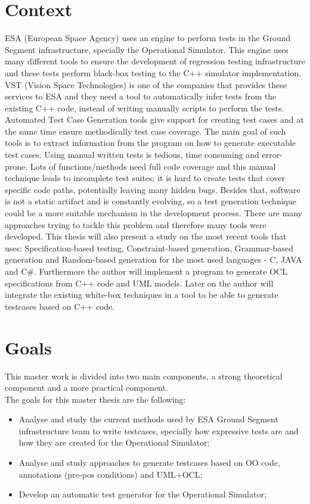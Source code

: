 \documentclass[a4paper,12pt]{article}
\begin{document}
\section{\Large Context}
ESA (European Space Agency) uses an engine to perform tests in the Ground Segment infrastructure, specially the Operational Simulator.
This engine uses many different tools to ensure the development of regression testing infrastructure and these tests perform black-box
testing to the C++ simulator implementation.
VST (Vision Space Technologies) is one of the companies that provides
these services to ESA and they need a tool to  automatically infer tests from the existing C++ code, instead of writing manually scripts to perform the tests.
Automated Test Case Generation tools give support for creating test cases and at the same time ensure methodically test case coverage.
The main goal of such tools is to extract information from the program on how to generate executable test cases.
Using manual written tests is tedious, time consuming and error-prone.
Lots of functions/methods need full code coverage and this manual technique leads to incomplete test suites;
it is hard to create tests that cover specific code paths, potentially leaving many hidden bugs.
Besides that, software is not a static artifact and is constantly evolving, so a test generation technique could be a more suitable mechanism in the development process.
There are many approaches trying to tackle this problem and therefore many tools were developed. This thesis will also present a study on the most
recent tools that uses: Specification-based testing, Constraint-based generation, Grammar-based generation and Random-based generation
for the most used languages - C, JAVA and C\#.
Furthermore the author will implement a program to generate OCL specifications from C++ code and UML models. Later on the author will integrate the
existing white-box techniques in a tool to be able to generate testcases based on C++ code.

\section{\Large Goals}
This master work is divided into two main components, a strong theoretical component and a more practical component.\\[6pt]
The goals for this master thesis are the following:
\begin{itemize}
\item Analyse and study the current methods used by ESA Ground Segment infrastructure team to write testcases, specially how expressive tests are and how they are created for the Operational Simulator;
\item Analyse and study approaches to generate testcases based on OO code, annotations (pre-pos conditions) and UML+OCL;
\item Develop an automatic test generator for the Operational Simulator;
\end{itemize}
\end{document}
